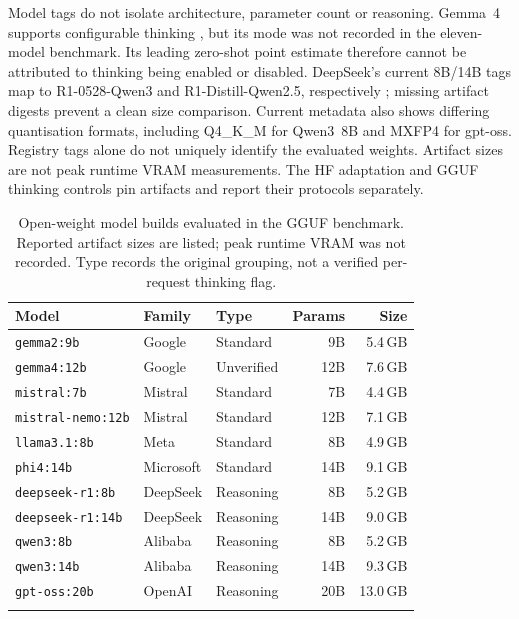\documentclass[pdflatex,sn-mathphys-num]{sn-jnl}
\begin{document}
Model tags do not isolate architecture, parameter count or reasoning.
Gemma~4 supports configurable thinking \cite{google2026gemma4card},
but its mode was not recorded in the eleven-model benchmark. Its leading
zero-shot point estimate therefore cannot be attributed to thinking
being enabled or disabled. DeepSeek's current 8B/14B
tags map to R1-0528-Qwen3 and R1-Distill-Qwen2.5, respectively
\cite{ollama2026deepseekregistry}; missing artifact digests prevent
a clean size comparison. Current metadata also shows differing
quantisation formats, including Q4\_K\_M for Qwen3~8B and MXFP4 for
gpt-oss. Registry tags alone do not uniquely identify the evaluated weights. Artifact sizes are not peak runtime VRAM measurements.
The HF adaptation and GGUF thinking controls pin artifacts and
report their protocols separately.

\begin{table}[!t]
  \renewcommand{\arraystretch}{1.2}
  \caption{Open-weight model builds evaluated in the GGUF benchmark. Reported
           artifact sizes are listed; peak runtime VRAM was not recorded. Type records
           the original grouping, not a verified per-request thinking flag.}
  \label{tab:models}
  \centering
  \footnotesize
  \setlength{\tabcolsep}{3pt}
  \begin{tabular}{@{}lllrr@{}}
    \toprule
    \textbf{Model} & \textbf{Family} & \textbf{Type} & \textbf{Params} & \textbf{Size} \\
    \midrule
    \texttt{gemma2:9b}         & Google     & Standard  & 9B   & 5.4\,GB \\
    \texttt{gemma4:12b}        & Google     & Unverified & 12B  & 7.6\,GB \\
    \texttt{mistral:7b}        & Mistral    & Standard  & 7B   & 4.4\,GB \\
    \texttt{mistral-nemo:12b}  & Mistral    & Standard  & 12B  & 7.1\,GB \\
    \texttt{llama3.1:8b}       & Meta       & Standard  & 8B   & 4.9\,GB \\
    \texttt{phi4:14b}          & Microsoft  & Standard  & 14B  & 9.1\,GB \\
    \midrule
    \texttt{deepseek-r1:8b}    & DeepSeek   & Reasoning & 8B   & 5.2\,GB \\
    \texttt{deepseek-r1:14b}   & DeepSeek   & Reasoning & 14B  & 9.0\,GB \\
    \texttt{qwen3:8b}          & Alibaba    & Reasoning & 8B   & 5.2\,GB \\
    \texttt{qwen3:14b}         & Alibaba    & Reasoning & 14B  & 9.3\,GB \\
    \texttt{gpt-oss:20b}       & OpenAI     & Reasoning & 20B  & 13.0\,GB \\
    \botrule
  \end{tabular}
\end{table}
\end{document}
